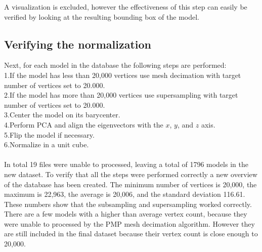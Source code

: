 \documentclass{bigdata}
\begin{document}
A visualization is excluded, however the effectiveness of this step can easily be verified by looking at the resulting bounding box of the model.

\subsection{Verifying the normalization}
Next, for each model in the database the following steps are performed: \\
\newline
1.If the model has less than 20,000 vertices use mesh decimation with target number of vertices set to 20.000.\\
2.If the model has more than 20,000 vertices use supersampling with target number of vertices set to 20.000.\\
3.Center the model on its barycenter.\\
4.Perform PCA and align the eigenvectors with the $x$, $y$, and $z$ axis.\\
5.Flip the model if necessary.\\
6.Normalize in a unit cube.\\~\\
In total 19 files were unable to processed, leaving a total of 1796 models in the new dataset. To verify that all the steps were performed correctly a new overview of the database has been created. The minimum number of vertices is 20,000, the maximum is 22,963, the average is 20,006, and the standard deviation 116.61. These numbers show that the subsampling and supersampling worked correctly. There are a few models with a higher than average vertex count, because they were unable to processed by the PMP mesh decimation algorithm. However they are still included in the final dataset because their vertex count is close enough to 20,000.
\newpage
\end{document}
